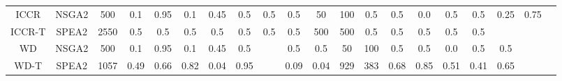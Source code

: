 \begin{table}
{\begin{tabular}{c c c c c c c c c c c c c c c c c c c c}
			ICCR & NSGA2 & 500 & 0.1 & 0.95 & 0.1 & 0.45 & 0.5 & 0.5 & 0.5 & 50 & 100 & 0.5 & 0.5 & 0.0 & 0.5 & 0.5 & 0.25 & 0.75 \\
			
			ICCR-T & SPEA2 & 2550 & 0.5 & 0.5 & 0.5 & 0.5 & 0.5 & 0.5 & 0.5 & 500 & 500 & 0.5 & 0.5 & 0.5 & 0.5 & 0.5 \\
			
			WD & NSGA2 & 500 & 0.1 & 0.95 & 0.1 & 0.45 & 0.5 & & 0.5 & 0.5 & 50 & 100 & 0.5 & 0.5 & 0.0 & 0.5 & 0.5 \\
			
			WD-T & SPEA2 & 1057 & 0.49 & 0.66 & 0.82 & 0.04 & 0.95 & & 0.09 & 0.04 & 929 & 383 & 0.68 & 0.85 & 0.51 & 0.41 & 0.65 \\
			\hline
		\end{tabular}
	}
\end{table}


